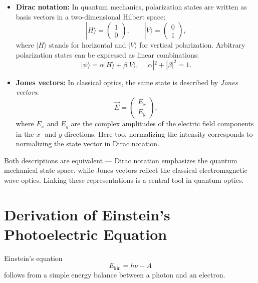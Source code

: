 \begin{itemize}
	\item \textbf{Dirac notation:}  
	In quantum mechanics, polarization states are written as basis vectors in a two-dimensional Hilbert space:  
	\[
	|H\rangle = \begin{pmatrix}1 \\ 0\end{pmatrix}, \qquad
	|V\rangle = \begin{pmatrix}0 \\ 1\end{pmatrix},
	\]
	where $|H\rangle$ stands for horizontal and $|V\rangle$ for vertical polarization.  
	Arbitrary polarization states can be expressed as linear combinations:  
	\[
	|\psi\rangle = \alpha |H\rangle + \beta |V\rangle, \quad |\alpha|^2 + |\beta|^2 = 1.
	\]
	
	\item \textbf{Jones vectors:}  
	In classical optics, the same state is described by \emph{Jones vectors}:  
	\[
	\vec{E} = \begin{pmatrix} E_x \\ E_y \end{pmatrix},
	\]
	where $E_x$ and $E_y$ are the complex amplitudes of the electric field components in the $x$- and $y$-directions.  
	Here too, normalizing the intensity corresponds to normalizing the state vector in Dirac notation.
\end{itemize}

\noindent
Both descriptions are equivalent — Dirac notation emphasizes the quantum mechanical state space, while Jones vectors reflect the classical electromagnetic wave optics.  
Linking these representations is a central tool in quantum optics.
\section{Derivation of Einstein’s Photoelectric Equation}
\label{anhangA:photoeffekt}

Einstein’s equation
\[
E_{\text{kin}} = h \nu - A
\]
follows from a simple energy balance between a photon and an electron.


